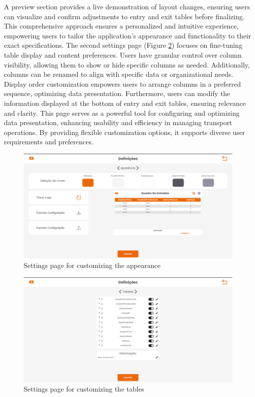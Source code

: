 \documentclass[10pt]{article}
\begin{document}
        A preview section provides a live demonstration of layout changes, ensuring users can visualize and confirm adjustments to entry and exit tables before finalizing.
        This comprehensive approach ensures a personalized and intuitive experience, empowering users to tailor the application's appearance and functionality to their exact specifications.
        The second settings page (Figure \ref{fig:settings_tables}) focuses on fine-tuning table display and content preferences. Users have granular control over column visibility, allowing them to show or hide specific columns as needed. Additionally, columns can be renamed to align with specific data or organizational needs.
        Display order customization empowers users to arrange columns in a preferred sequence, optimizing data presentation.
        Furthermore, users can modify the information displayed at the bottom of entry and exit tables, ensuring relevance and clarity.
        This page serves as a powerful tool for configuring and optimizing data presentation, enhancing usability and efficiency in managing transport operations. By providing flexible customization options, it supports diverse user requirements and preferences.

        \vfill
        \begin{figure}[htbp!]
            \centering
            \includegraphics[width=1\textwidth]{aparencia}
            \caption{Settings page for customizing the appearance}
            \label{fig:settings_appearance}
        \end{figure}
        \vfill

        \begin{figure}[htbp]
            \centering
            \includegraphics[width=1\textwidth]{tabelas}
            \caption{Settings page for customizing the tables}
            \label{fig:settings_tables}
        \end{figure}
\end{document}
